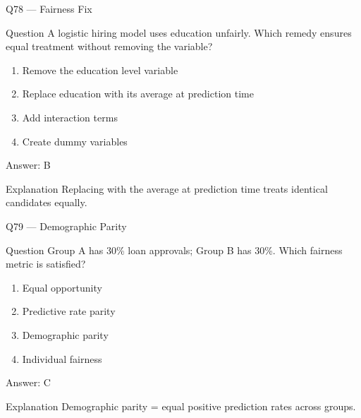 \documentclass[aspectratio=169,8pt]{beamer}
\begin{document}
	\begin{frame}{Q78 --- Fairness Fix}
		\begin{block}{Question}
			A logistic hiring model uses education unfairly. Which remedy ensures equal treatment without removing the variable?
		\end{block}
		\begin{enumerate}
			\item Remove the education level variable
			\item Replace education with its average at prediction time
			\item Add interaction terms
			\item Create dummy variables
		\end{enumerate}
		\begin{exampleblock}{Answer: B}\end{exampleblock}
		\begin{block}{Explanation}
			Replacing with the average at prediction time treats identical candidates equally.
		\end{block}
	\end{frame}
	
	\begin{frame}{Q79 --- Demographic Parity}
		\begin{block}{Question}
			Group A has 30\% loan approvals; Group B has 30\%. Which fairness metric is satisfied?
		\end{block}
		\begin{enumerate}
			\item Equal opportunity
			\item Predictive rate parity
			\item Demographic parity
			\item Individual fairness
		\end{enumerate}
		\begin{exampleblock}{Answer: C}\end{exampleblock}
		\begin{block}{Explanation}
			Demographic parity = equal positive prediction rates across groups.
		\end{block}
	\end{frame}
	
\end{document}
